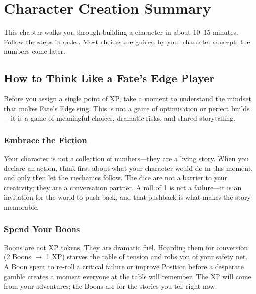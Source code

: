 \chapter{Character Creation Summary}
\label{ch:character-creation}

\begin{tcolorbox}[colback=blue!5!white,colframe=blue!75!black,title=Quick Start,breakable]
This chapter walks you through building a character in about 10--15 minutes. Follow the steps in order. Most choices are guided by your character concept; the numbers come later.
\end{tcolorbox}

\section{How to Think Like a Fate's Edge Player}

Before you assign a single point of XP, take a moment to understand the mindset that makes Fate's Edge sing. This is not a game of optimisation or perfect builds---it is a game of meaningful choices, dramatic risks, and shared storytelling.

\subsection{Embrace the Fiction}
Your character is not a collection of numbers---they are a living story. When you declare an action, think first about what your character would do in this moment, and only then let the mechanics follow. The dice are not a barrier to your creativity; they are a conversation partner. A roll of 1 is not a failure---it is an invitation for the world to push back, and that pushback is what makes the story memorable.

\subsection{Spend Your Boons}
Boons are not XP tokens. They are dramatic fuel. Hoarding them for conversion (2 Boons $\to$ 1 XP) starves the table of tension and robs you of your safety net. A Boon spent to re-roll a critical failure or improve Position before a desperate gamble creates a moment everyone at the table will remember. The XP will come from your adventures; the Boons are for the stories you tell right now.

